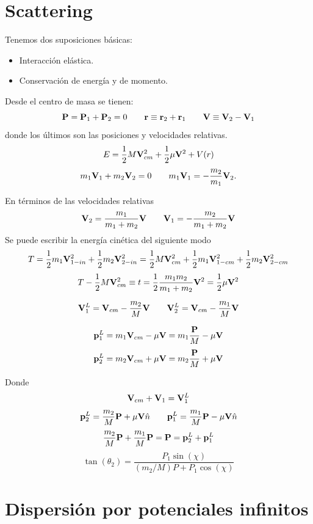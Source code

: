 \documentclass[10pt,oneside]{CBFT_book}
\begin{document}
\section{Scattering}

Tenemos dos suposiciones básicas:
	\begin{itemize}
		\item Interacción elástica.
		\item Conservación de energía y de momento.
	\end{itemize}
	
Desde el centro de masa se tienen:
\[
	\vb{P} = \vb{P}_1 + \vb{P}_2 = 0	\qquad		\vb{r} \equiv \vb{r}_2 + \vb{r}_1
	\qquad		\vb{V} \equiv \vb{V}_2 - \vb{V}_1
\]
donde los últimos son las posiciones y velocidades relativas.
\[
	E = \frac{1}{2} M \vb{V}_{cm}^2 + \frac{1}{2} \mu \vb{V}^2 + V(r)
\]
\[
	m_1 \vb{V}_1 + m_2 \vb{V}_2 = 0 \qquad m_1 \vb{V}_1 = -\frac{m_2}{m_1} \vb{V}_2.
\]

En términos de las velocidades relativas
\[
	\vb{V}_2 = \frac{m_1}{m_1 + m_2} \vb{V} \qquad \vb{V}_1 = -\frac{m_2}{m_1 + m_2} \vb{V}
\]
Se puede escribir la energía cinética del siguiente modo
\[
	T = \frac{1}{2} m_1 \vb{V}_{1-in}^2 + \frac{1}{2} m_2 \vb{V}_{2-in}^2 =
	\frac{1}{2} M \vb{V}_{cm}^2 + \frac{1}{2} m_1 \vb{V}_{1-cm}^2 + \frac{1}{2} m_2 \vb{V}_{2-cm}^2 
\]
\[
	T - \frac{1}{2} M \vb{V}_{cm}^2 \equiv t = \frac{1}{2} \frac{m_1 m_2}{m_1 + m_2} \vb{V}^2 =
							\frac{1}{2} \mu \vb{V}^2
\]

\[
	\vb{V}_1^L = \vb{V}_{cm} - \frac{m_2}{M} \vb{V}	\qquad \vb{V}_2^L = \vb{V}_{cm} - \frac{m_1}{M} \vb{V}
\]

\[
	\vb{p}_1^L = m_1 \vb{V}_{cm} - \mu \vb{V} = m_1 \frac{\vb{P}}{M} - \mu \vb{V}
\]
\[
	\vb{p}_2^L = m_2 \vb{V}_{cm} + \mu \vb{V} = m_2 \frac{\vb{P}}{M} + \mu \vb{V}
\]

Donde 
\[
	\vb{V}_{cm} + \vb{V}_1 = \vb{V}_1^L
\]
\[
	\vb{p}_2^L = \frac{m_2}{M} \vb{P} + \mu \vb{V}\hat{n}		\qquad	 \vb{p}_1^L = \frac{m_1}{M} \vb{P} - \mu \vb{V}\hat{n}
\]
\[
	\frac{m_2}{M} \vb{P} + \frac{m_1}{M} \vb{P} = \vb{P} = \vb{p}_2^L + \vb{p}_1^L
\]
\[
	\tan(\theta_2) = \frac{P_1 \sin(\chi)}{ (m_2/M) P + P_1\cos(\chi)}
\]

\section{Dispersión por potenciales infinitos}
\end{document}
